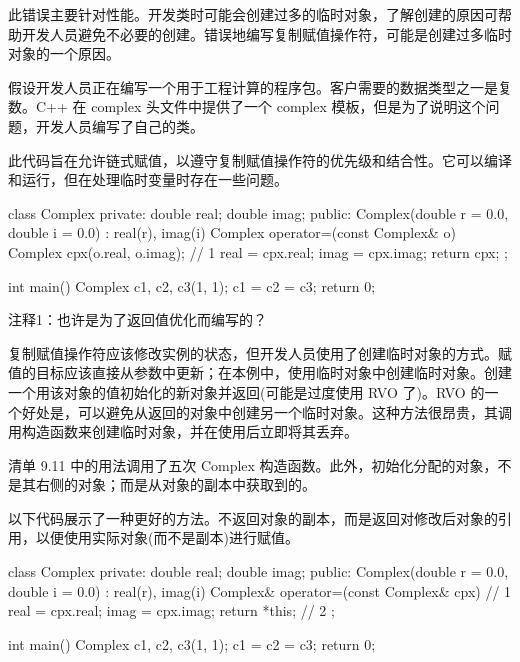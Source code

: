 此错误主要针对性能。开发类时可能会创建过多的临时对象，了解创建的原因可帮助开发人员避免不必要的创建。错误地编写复制赋值操作符，可能是创建过多临时对象的一个原因。


假设开发人员正在编写一个用于工程计算的程序包。客户需要的数据类型之一是复数。C++ 在 complex 头文件中提供了一个 complex 模板，但是为了说明这个问题，开发人员编写了自己的类。

此代码旨在允许链式赋值，以遵守复制赋值操作符的优先级和结合性。它可以编译和运行，但在处理临时变量时存在一些问题。


\begin{cpp}
class Complex {
private:
  double real;
  double imag;
public:
  Complex(double r = 0.0, double i = 0.0) : real(r), imag(i) {}
  Complex operator=(const Complex& o) {
    Complex cpx(o.real, o.imag); // 1
    real = cpx.real;
    imag = cpx.imag;
    return cpx;
  }
};

int main() {
  Complex c1, c2, c3(1, 1);
  c1 = c2 = c3;
  return 0;
}
\end{cpp}

{\footnotesize
注释1：也许是为了返回值优化而编写的？
}


复制赋值操作符应该修改实例的状态，但开发人员使用了创建临时对象的方式。赋值的目标应该直接从参数中更新；在本例中，使用临时对象中创建临时对象。创建一个用该对象的值初始化的新对象并返回(可能是过度使用 RVO 了)。RVO 的一个好处是，可以避免从返回的对象中创建另一个临时对象。这种方法很昂贵，其调用构造函数来创建临时对象，并在使用后立即将其丢弃。

清单 9.11 中的用法调用了五次 Complex 构造函数。此外，初始化分配的对象，不是其右侧的对象；而是从对象的副本中获取到的。


以下代码展示了一种更好的方法。不返回对象的副本，而是返回对修改后对象的引用，以便使用实际对象(而不是副本)进行赋值。


\begin{cpp}
class Complex {
private:
  double real;
  double imag;
public:
  Complex(double r = 0.0, double i = 0.0) : real(r), imag(i) {}
  Complex& operator=(const Complex& cpx) { // 1
    real = cpx.real;
    imag = cpx.imag;
    return *this; // 2
  }
};

int main() {
  Complex c1, c2, c3(1, 1);
  c1 = c2 = c3;
  return 0;
}
\end{cpp}

